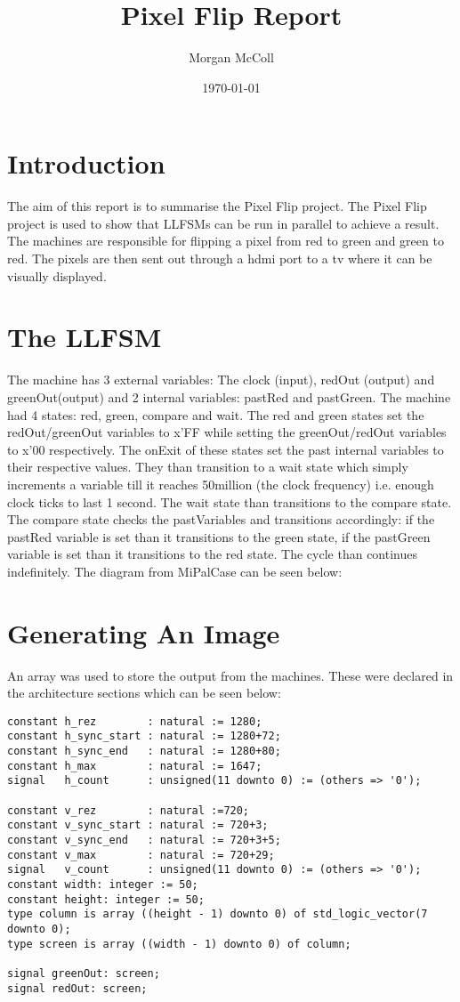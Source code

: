 \documentclass{article}
\begin{document}
	\title{Pixel Flip Report}
	\author{Morgan McColl}
	\date{\today}
	\maketitle
	\section{Introduction}
		The aim of this report is to summarise the Pixel Flip project. The Pixel Flip project is used to show that LLFSMs can be run in parallel to achieve a result. The machines are responsible for flipping a pixel from red to green and green to red. The pixels are then sent out through a hdmi port to a tv where it can be visually displayed.
	\section{The LLFSM}
		The machine has 3 external variables: The clock (input), redOut (output) and greenOut(output) and 2 internal variables: pastRed and pastGreen. The machine had 4 states: red, green, compare and wait. The red and green states set the redOut/greenOut variables to x'FF while setting the greenOut/redOut variables to x'00 respectively. The onExit of these states set the past internal variables to their respective values. They than transition to a wait state which simply increments a variable till it reaches 50million (the clock frequency) i.e. enough clock ticks to last 1 second. The wait state than transitions to the compare state. The compare state checks the pastVariables and transitions accordingly: if the pastRed variable is set than it transitions to the green state, if the pastGreen variable is set than it transitions to the red state. The cycle than continues indefinitely. The diagram from MiPalCase can be seen below:
	\section{Generating An Image}
		An array was used to store the output from the machines. These were declared in the architecture sections which can be seen below:
		
		\begin{verbatim}
constant h_rez        : natural := 1280;
constant h_sync_start : natural := 1280+72;
constant h_sync_end   : natural := 1280+80;
constant h_max        : natural := 1647;
signal   h_count      : unsigned(11 downto 0) := (others => '0');

constant v_rez        : natural :=720;
constant v_sync_start : natural := 720+3;
constant v_sync_end   : natural := 720+3+5;
constant v_max        : natural := 720+29;
signal   v_count      : unsigned(11 downto 0) := (others => '0');
constant width: integer := 50;
constant height: integer := 50;
type column is array ((height - 1) downto 0) of std_logic_vector(7 downto 0);
type screen is array ((width - 1) downto 0) of column;

signal greenOut: screen;
signal redOut: screen;
		\end{verbatim}
			
\end{document}
